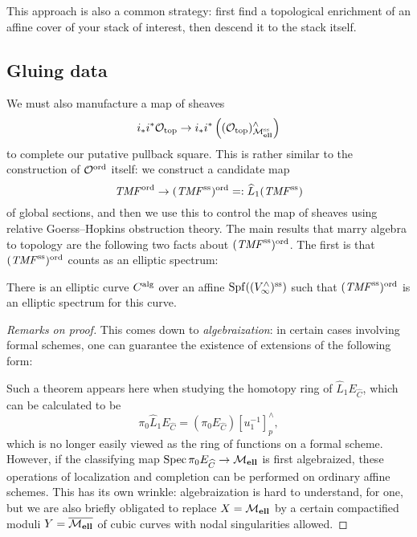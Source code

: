 \begin{remark}
This approach is also a common strategy: first find a topological enrichment of an affine cover of your stack of interest, then descend it to the stack itself.
\end{remark}





\subsection*{Gluing data}

We must also manufacture a map of sheaves \[i_* i^* \mathcal{O}_{\mathrm{top}} \to i_* i^* \left((\mathcal{O}_{\mathrm{top}})^\wedge_{\mathcal{M}_{\mathbf{ell}}^{\mathrm{ss}}}\right)\] to complete our putative pullback square.  This is rather similar to the construction of \(\mathcal{O}^{\mathrm{ord}}\) itself: we construct a candidate map \[\mathit{TMF}^{\mathrm{ord}} \to (\mathit{TMF}^{\mathrm{ss}})^{\mathrm{ord}} =: \widehat L_1 (\mathit{TMF}^{\mathrm{ss}})\] of global sections, and then we use this to control the map of sheaves using relative Goerss--Hopkins obstruction theory.  The main results that marry algebra to topology are the following two facts about \((\mathit{TMF}^{\mathrm{ss}})^{\mathrm{ord}}\).  The first is that \((\mathit{TMF}^{\mathrm{ss}})^{\mathrm{ord}}\) counts as an elliptic spectrum:

\begin{lemma}
There is an elliptic curve \(C^{\mathrm{alg}}\) over an affine \(\operatorname{Spf} ((V^\wedge_\infty)^{\mathrm{ss}})\) such that \((\mathit{TMF}^{\mathrm{ss}})^{\mathrm{ord}}\) is an elliptic spectrum for this curve.
\end{lemma}
\begin{proof}[Remarks on proof]
This comes down to \textit{algebraization}: in certain cases involving formal schemes, one can guarantee the existence of extensions of the following form:
\begin{center}
\end{center}
Such a theorem appears here when studying the homotopy ring of \(\widehat L_1 E_{\widehat C}\), which can be calculated to be \[\pi_0 \widehat L_1 E_{\widehat C} = (\pi_0 E_{\widehat C})[u_1^{-1}]^\wedge_p,\] which is no longer easily viewed as the ring of functions on a formal scheme.  However, if the classifying map \(\operatorname{Spec} \pi_0 E_{\widehat C} \to \mathcal{M}_{\mathbf{ell}}\) is first algebraized, these operations of localization and completion can be performed on ordinary affine schemes.  This has its own wrinkle: algebraization is hard to understand, for one, but we are also briefly obligated to replace \(X = \mathcal{M}_{\mathbf{ell}}\) by a certain compactified moduli \(Y = \overline{\mathcal{M}_{\mathbf{ell}}}\) of cubic curves with nodal singularities allowed.
\end{proof}

